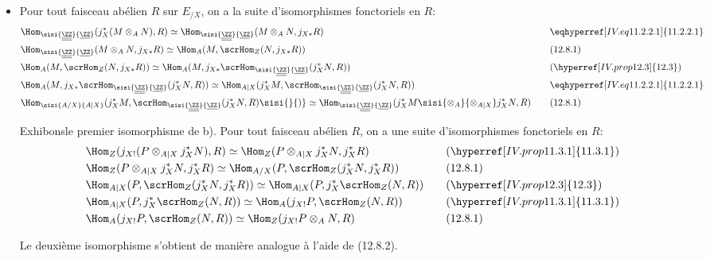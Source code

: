 \documentclass[10pt]{../fichiers-configuration-latex/smfart}
\begin{document}
\begin{itemize}
\item[Démontrons a).] Pour tout faisceau abélien $R$ sur $E_{/X}$, on
a la suite d'isomorphismes fonctoriels en $R$:
\begin{alignat*}{2}
&\Hom_{\sisi{\underline{\underline{\ZZ}}}{\underline{\ZZ}}}(j^{\ast}_X(M\otimes_A N),R)\simeq \Hom_{\sisi{\underline{\underline{\ZZ}}}{\underline{\ZZ}}} (M\otimes_A N,
j_{X\ast}R) &\quad& \eqhyperref[IV.eq11.2.2.1]{11.2.2.1}\\
&\Hom_{\sisi{\underline{\underline{\ZZ}}}{\underline{\ZZ}}}(M\otimes_A N, j_{X\ast}R)\simeq \Hom_A(M, \scrHom_Z(N,
j_{X\ast}R)) && (12.8.1)\\
&\Hom_A (M, \scrHom_Z(N, j_{X\ast}R))\simeq
\Hom_A(M,j_{X\ast}\scrHom_{\sisi{\underline{\underline{\ZZ}}}{\underline{\ZZ}}}(j^{\ast}_XN,R)) && (\hyperref[IV.prop12.3]{12.3})\\
& \Hom_A(M, j_{X\ast}\scrHom_{\sisi{\underline{\underline{\ZZ}}}{\underline{\ZZ}}}(j^{\ast}_XN,R))\simeq \Hom_{A|
X}(j^{\ast}_XM, \scrHom_{\sisi{\underline{\underline{\ZZ}}}{\underline{\ZZ}}} (j^{\ast}_XN,R)) && \eqhyperref[IV.eq11.2.2.1]{11.2.2.1}\\
&\Hom_{\sisi{A/X}{A|X}}(j^{\ast}_XM, \scrHom_{\sisi{\underline{\underline{\ZZ}}}{\underline{\ZZ}}} (j^{\ast}_XN,R)\sisi{}{)}\simeq \Hom_{\sisi{\underline{\underline{\ZZ}}}{\underline{\ZZ}}}
(j^{\ast}_XM\sisi{\otimes_A}{\otimes_{A|X}} j^{\ast}_X N,R) && (12.8.1)
\end{alignat*}

Exhibons\pageoriginale le premier isomorphisme de b). Pour tout
faisceau abélien $R$, on a une suite d'isomorphismes fonctoriels en
$R$:
\begin{alignat*}{2}
& \Hom_Z(j_{X!}(P\otimes_{A| X}j^{\ast}_XN),R)\simeq
\Hom_Z(P\otimes_{A| X} j^{\ast}_X N, j^{\ast}_X R) &\quad&
(\hyperref[IV.prop11.3.1]{11.3.1})\\
& \Hom_Z(P\otimes_{A| X}j^{\ast}_XN, j^{\ast}_XR)\simeq
\Hom_{A/X}(P,\scrHom_Z(j^{\ast}_XN, j^{\ast}_XR)) && (12.8.1)\\
&\Hom_{A| X}(P,\scrHom_Z (j^{\ast}_XN, j^{\ast}_XR))\simeq
\Hom_{A| X}(P, j^{\ast}_X\scrHom_Z (N,R)) && (\hyperref[IV.prop12.3]{12.3})\\
&\Hom_{A| X}(P, j^{\ast}_X\scrHom_Z(N,R))\simeq \Hom_A (j_{X!}P,
\scrHom_Z (N,R)) && (\hyperref[IV.prop11.3.1]{11.3.1})\\
&\Hom_A (j_{X!}P, \scrHom_Z(N,R))\simeq \Hom_Z (j_{X!}P\otimes_A
N,R) && (12.8.1)
\end{alignat*}

Le deuxième isomorphisme s'obtient de manière analogue à l'aide de
(12.8.2).
\end{itemize}
\end{document}
